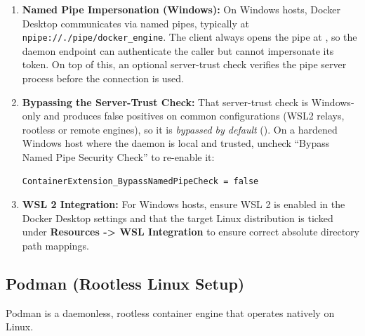 \begin{enumerate}
    \item \textbf{Named Pipe Impersonation (Windows):}
    On Windows hosts, Docker Desktop communicates via named pipes, typically at \texttt{npipe://./pipe/docker\_engine}. The client always opens the pipe at , so the daemon endpoint can authenticate the caller but cannot impersonate its token. On top of this, an optional server-trust check verifies the pipe server process before the connection is used.
    \item \textbf{Bypassing the Server-Trust Check:}
    That server-trust check is Windows-only and produces false positives on common configurations (WSL2 relays, rootless or remote engines), so it is \emph{bypassed by default} (). On a hardened Windows host where the daemon is local and trusted, uncheck ``Bypass Named Pipe Security Check'' to re-enable it:
    \begin{lstlisting}[language=bash]
ContainerExtension_BypassNamedPipeCheck = false
\end{lstlisting}
    \item \textbf{WSL 2 Integration:}
    For Windows hosts, ensure WSL 2 is enabled in the Docker Desktop settings and that the target Linux distribution is ticked under \textbf{Resources -> WSL Integration} to ensure correct absolute directory path mappings.
\end{enumerate}

\subsection{Podman (Rootless Linux Setup)}
Podman is a daemonless, rootless container engine that operates natively on Linux.

